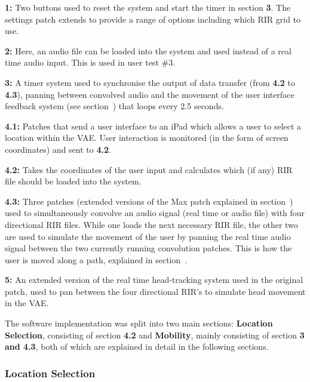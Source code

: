 \documentclass[../../main.tex]{subfiles}
\begin{document}
				\textbf{1:} Two buttons used to reset the system and start the timer in section \textbf{3}. The settings patch extends to provide a range of options including which \ac{RIR} grid to use.

				\textbf{2:} Here, an audio file can be loaded into the system and used instead of a real time audio input. This is used in user test \#3.

				\textbf{3:} A timer system used to synchronise the output of data transfer (from \textbf{4.2} to \textbf{4.3}), panning between convolved audio and the movement of the user interface feedback system (see section~) that loops every 2.5 seconds.

				\textbf{4.1:} Patches that send a user interface to an iPad which allows a user to select a location within the \ac{VAE}. User interaction is monitored (in the form of screen coordinates) and sent to \textbf{4.2}.

				\textbf{4.2:} Takes the coordinates of the user input and calculates which (if any) \ac{RIR} file should be loaded into the system.

				\textbf{4.3:} Three patches (extended versions of the Max patch explained in section~) used to simultaneously convolve an audio signal (real time or audio file) with four directional \ac{RIR} files. While one loads the next necessary \ac{RIR} file, the other two are used to simulate the movement of the user by panning the real time audio signal between the two currently running convolution patches. This is how the user is moved along a path, explained in section~.

				\textbf{5:} An extended version of the real time head-tracking system used in the original patch, used to pan between the four directional \ac{RIR}'s to simulate head movement in the \ac{VAE}.
		

				The software implementation was split into two main sections: \textbf{Location Selection}, consisting of section \textbf{4.2} and \textbf{Mobility}, mainly consisting of section \textbf{3 and 4.3}, both of which are explained in detail in the following sections.



		\subsubsection{Location Selection}
		\label{locationSelection}
\end{document}
